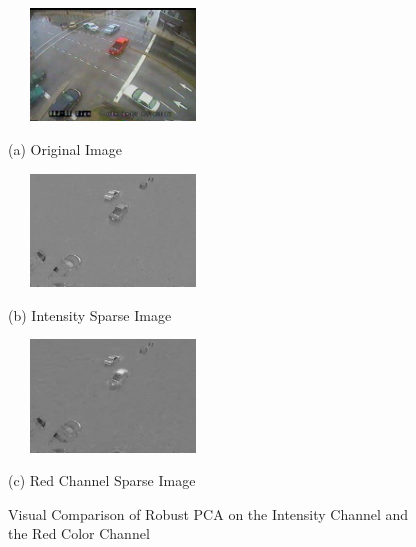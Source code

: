 \documentclass{article}
\begin{document}
\begin{figure}[htb]

\begin{minipage}[b]{0.3333\linewidth}
  \centering
  \centerline{\includegraphics[width=5.55cm, height=3cm]{Imgs/Orig_0412041242.jpg}}
  \centerline{(a) Original Image}\medskip
\end{minipage}
%
\begin{minipage}[b]{0.3333\linewidth}
  \centering
  \centerline{\includegraphics[width=5.55cm, height=3cm]{Imgs/SP_Intensity_0412041242}}
  \centerline{(b) Intensity Sparse Image}\medskip
\end{minipage}
\hfill
\begin{minipage}[b]{0.3333\linewidth}
  \centering
  \centerline{\includegraphics[width=5.55cm, height=3cm]{Imgs/SP_IMG_R_0412041242.jpg}}
  \centerline{(c) Red Channel Sparse Image}\medskip
\end{minipage}
%
\caption{Visual Comparison of Robust PCA on the Intensity Channel  and the Red Color Channel}
\label{fig:colorComp}
\medskip
%
\end{figure}
\end{document}
